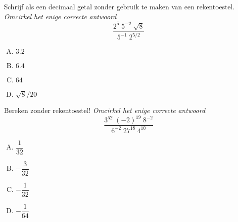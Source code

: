 \documentclass[12pt]{article}
\begin{document}
\begin{oefening}
Schrijf als een decimaal getal zonder gebruik te maken van een rekentoestel. {\em\small Omcirkel het enige correcte antwoord}
$$\dfrac{2^5\;5^{-2}\;\sqrt{8}}{5^{-1}\;2^{5/2}}$$
\begin{multicols}{4}
\begin{enumerate}[(A)]
  \item $3.2$
  \item $6.4$
  \item $64$
  \item $\sqrt{8}/20$
\end{enumerate}
\end{multicols}
\end{oefening}
\vfil

\begin{oefening}
Bereken zonder rekentoestel! {\em\small Omcirkel het enige correcte antwoord}
$$\dfrac{3^{52}\;(-2)^{19}\;8^{-2}}{6^{-2}\;27^{18}\;4^{10}}$$
\begin{multicols}{4}
\begin{enumerate}[(A)]
  \item $\dfrac{1}{32}$
  \item $-\dfrac{3}{32}$
  \item $-\dfrac{1}{32}$
  \item $-\dfrac{1}{64}$
\end{enumerate}
\end{multicols}
\end{oefening}
\end{document}

